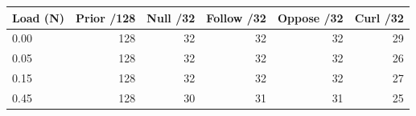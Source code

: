 \begin{tabular}{lrrrrr}
\toprule
Load (N) & Prior /128 & Null /32 & Follow /32 & Oppose /32 & Curl /32\\
\midrule
0.00 & 128 & 32 & 32 & 32 & 29\\
0.05 & 128 & 32 & 32 & 32 & 26\\
0.15 & 128 & 32 & 32 & 32 & 27\\
0.45 & 128 & 30 & 31 & 31 & 25\\
\bottomrule
\end{tabular}
